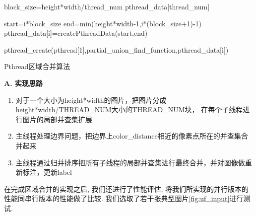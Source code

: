 \documentclass[a4paper, 11pt]{article}
\begin{document}
\begin{algorithm}[H]
	\DontPrintSemicolon
	
	block\_size=height*width/thread\_num \; 
    pthread\_data[thread\_num]  \;
    
      \;
     {
        start=i*block\_size  \;
        end=min(height*width-1,i*(block\_size+1)-1)   \;
        pthread\_data[i]=createPthreadData(start,end) \; 
    
        pthread\_create(pthread[1],partial\_union\_find\_function,pthread\_data[i])  \;

    }




	\caption{Pthread区域合并算法}
\end{algorithm}

\textbf{A. 实现思路}

\begin{enumerate}
    \item 对于一个大小为height*width的图片，把图片分成height*width/THREAD\_NUM大小的THREAD\_NUM块，
    在每个子线程进行图片的局部并查集扩展
    \item 主线程处理边界问题，把边界上color\_distance相近的像素点所在的并查集合并起来
    \item 主线程通过归并排序把所有子线程的局部并查集进行最终合并，并对图像做重新标注，更新label
\end{enumerate}

在完成区域合并的实现之后, 我们还进行了性能评估, 
将我们所实现的并行版本的性能同串行版本的性能做了比较. 我们选取了若干张典型图片\ref{fig:uf_input}进行测试.
\end{document}
